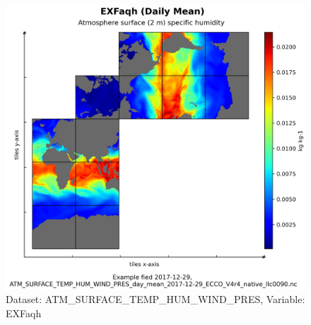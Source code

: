 \begin{figure}[H]
\centering
\includegraphics[scale=0.55]{../images/plots/native_plots/Atmosphere_Surface_Temperature_Humidity_Wind_and_Pressure/EXFaqh.png}
\caption{Dataset: ATM\_SURFACE\_TEMP\_HUM\_WIND\_PRES, Variable: EXFaqh}
\label{tab:table-ATM_SURFACE_TEMP_HUM_WIND_PRES_EXFaqh-Plot}
\end{figure}
\pagebreak
